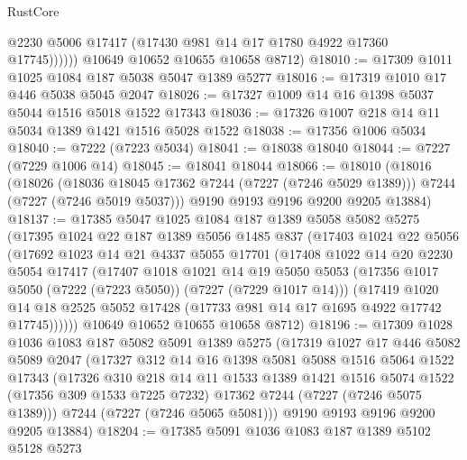 \begin{lexlean}{RustCore}
\begin{coremodule}
                @2230
                @5006
                @17417
                (@17430 @981 @14 @17 @1780 @4922 @17360 @17745))))))
      @10649
      @10652
      @10655
      @10658
      @8712)
@18010 := @17309 @1011 @1025 @1084 @187 @5038 @5047 @1389 @5277
@18016 := @17319 @1010 @17 @446 @5038 @5045 @2047
@18026 := @17327 @1009 @14 @16 @1398 @5037 @5044 @1516 @5018 @1522 @17343
@18036 := @17326 @1007 @218 @14 @11 @5034 @1389 @1421 @1516 @5028 @1522
@18038 := @17356 @1006 @5034
@18040 := @7222 (@7223 @5034)
@18041 := @18038 @18040
@18044 := @7227 (@7229 @1006 @14)
@18045 := @18041 @18044
@18066 := @18010
    (@18016
      (@18026
        (@18036 @18045 @17362 @7244 (@7227 (@7246 @5029 @1389)))
        @7244
        (@7227 (@7246 @5019 @5037)))
      @9190
      @9193
      @9196
      @9200
      @9205
      @13884)
@18137 := @17385
    @5047
    @1025
    @1084
    @187
    @1389
    @5058
    @5082
    @5275
    (@17395
      @1024
      @22
      @187
      @1389
      @5056
      @1485
      @837
      (@17403
        @1024
        @22
        @5056
        (@17692
          @1023
          @14
          @21
          @4337
          @5055
          @17701
          (@17408
            @1022
            @14
            @20
            @2230
            @5054
            @17417
            (@17407
              @1018
              @1021
              @14
              @19
              @5050
              @5053
              (@17356 @1017 @5050 (@7222 (@7223 @5050)) (@7227 (@7229 @1017 @14)))
              (@17419
                @1020
                @14
                @18
                @2525
                @5052
                @17428
                (@17733 @981 @14 @17 @1695 @4922 @17742 @17745))))))
      @10649
      @10652
      @10655
      @10658
      @8712)
@18196 := @17309
    @1028
    @1036
    @1083
    @187
    @5082
    @5091
    @1389
    @5275
    (@17319
      @1027
      @17
      @446
      @5082
      @5089
      @2047
      (@17327
        @312
        @14
        @16
        @1398
        @5081
        @5088
        @1516
        @5064
        @1522
        @17343
        (@17326
          @310
          @218
          @14
          @11
          @1533
          @1389
          @1421
          @1516
          @5074
          @1522
          (@17356 @309 @1533 @7225 @7232)
          @17362
          @7244
          (@7227 (@7246 @5075 @1389)))
        @7244
        (@7227 (@7246 @5065 @5081)))
      @9190
      @9193
      @9196
      @9200
      @9205
      @13884)
@18204 := @17385 @5091 @1036 @1083 @187 @1389 @5102 @5128 @5273

\end{coremodule}
\end{lexlean}
